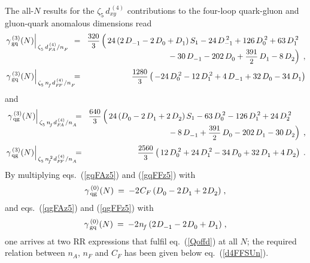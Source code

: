 \documentclass[12pt]{article}
\newcommand{\beq}{\begin{equation}}
\newcommand{\eeq}{\end{equation}}
\newcommand{\bea}{\begin{eqnarray}}
\newcommand{\eea}{\end{eqnarray}}
\newcommand{\nn}{\nonumber}
\newcommand{\hspp}{{\hspace{5mm}}}
\def\frct#1#2{\mbox{\small{$\displaystyle\frac{#1}{#2}$}}}
\def\zr#1{{\zeta_{#1}^{}}}
\def\nf{{n^{}_{\! f}}}
\def\nfs{{n^{\,2}_{\! f}}}
\def\DNn#1{D_0^{\:#1}}
\def\DNm#1{D_{-1}^{\:#1}}
\def\DNp#1{D_1^{\:#1}}
\def\DNpp#1{D_2^{\:#1}}
\def\S(#1){{{S}_{#1}}}
\begin{document}
The all-$N$ results for the $\zr5\, d^{\,(4)}_{xy}$ contributions to 
the four-loop quark-gluon and gluon-quark anomalous dimensions read
%
\bea
\label{gqFAz5}
  \left. \gamma_{\,\rm gq}^{\,(3)}(N)
  \right|_{\,\zr5\,d^{\,(4)}_{F\!A}/n_F^{}} \;\;
  &\!=\!& 
  \frct{320}{3} \* \left(\,
    24 \,\* ( 2 \,\* \DNm{} - 2 \,\* \DNn{} + \DNp{} ) \,\* \S(1)
     - 24 \,\* \DNm2
     + 126 \,\* \DNn2
     + 63 \,\* \DNp2
\phantom{\frct{1}{2}} \right.  \nn \\[-2mm] & & \hspp \left. \mbox{}
     - 30 \,\* \DNm{}
     - 202 \,\* \DNn{}
     + \frct{391}{2} \,\* \DNp{}
     -  8 \,\* \DNpp{}
  \right)
\; , \\[1mm] 
\label{gqFFz5}
  \left. \gamma_{\,\rm gq}^{\,(3)}(N)
  \right|_{\,\zr5\,\nf\:\! d^{\,(4)}_{F\!F}/n_F^{}} \!\!
  &\!=\!&
 \frct{1280}{3} \* \left(\, 
     - 24 \,\* \DNn2
     - 12 \,\* \DNp2
     +  4 \,\* \DNm{}
     + 32 \,\* \DNn{}
     - 34 \,\* \DNp{}
 \right)
\eea 
and
\bea
\label{qgFAz5}
  \left. \gamma_{\,\rm qg}^{\,(3)}(N)
  \right|_{\,\zr5\,\nf\:\! d^{\,(4)}_{F\!A}/n_A^{}} \!\!
  &\!=\!& 
 \frct{640}{3} \* \left(\, 
    24 \,\* ( \DNn{} - 2 \,\* \DNp{} + 2 \,\* \DNpp{} ) \,\* \S(1)
     - 63 \,\* \DNn2
     - 126 \,\* \DNp2
     + 24 \,\* \DNpp2
\phantom{\frct{111}{2}} \right.  \nn \\[-2mm] & & \hspp \left. \mbox{}
     -  8 \,\* \DNm{}
     + \frct{391}{2} \,\* \DNn{}
     - 202 \,\* \DNp{}
     - 30 \,\* \DNpp{}
 \right)
\; , \\[1mm]
\label{qgFFz5}
  \left. \gamma_{\,\rm qg}^{\,(3)}(N)
  \right|_{\,\zr5\,\nfs\:\! d^{\,(4)}_{F\!F}/n_A^{}} \!\!
  &\!=\!& \mbox{}
 \frct{2560}{3} \* \left(\, 
       12 \,\* \DNn2
     + 24 \,\* \DNp2
     - 34 \,\* \DNn{}
     + 32 \,\* \DNp{}
     +  4 \,\* \DNpp{}
 \right)
\; .
\eea
%
By multiplying eqs.~(\ref{gqFAz5}) and (\ref{gqFFz5}) with 
\beq
  \gamma_{\,\rm qg}^{\,(0)}(N) \:=\: 
  - 2\:\!C_F\, (\DNn{}- 2\:\!\DNp{}+ 2\:\!\DNpp{}) \; ,
\eeq
and eqs.~(\ref{qgFAz5}) and (\ref{qgFFz5}) with
\beq
  \gamma_{\,\rm gq}^{\,(0)}(N) \:=\: 
  - 2\:\!\nf\, (2\:\!\DNm{}- 2\:\!\DNn{}+ \DNp{}) \; ,
\eeq
one arrives at two RR expressions that fulfil eq.~(\ref{Qoffd}) at all $N$; 
the required relation between $n_A^{}$, $n_F^{}$ and $C_F$ has been given 
below eq.~(\ref{d4FFSUn}).
\end{document}
